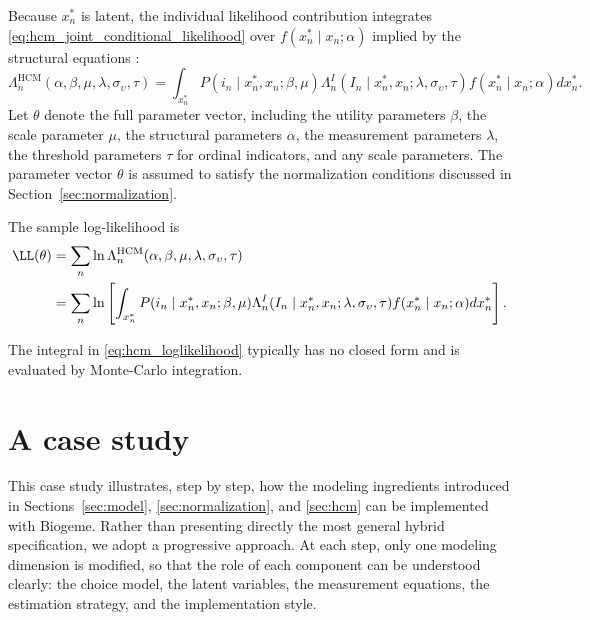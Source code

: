 \documentclass[12pt,a4paper]{article}
\begin{document}
Because $x_n^*$ is latent, the individual likelihood contribution
integrates \eqref{eq:hcm_joint_conditional_likelihood} over
$f(x_n^*\mid x_n;\alpha)$ implied by the structural equations
:
\begin{equation}
  \label{eq:hcm_likelihood}
  \Lambda_n^{\text{HCM}}(\alpha,\beta,\mu,\lambda,\sigma_{\upsilon},\tau)
=
\int_{x_n^*}
P(i_n\mid x_n^*,x_n;\beta,\mu)
\Lambda_n^{I}(I_n\mid x_n^*,x_n;\lambda,\sigma_{\upsilon},\tau)
f(x_n^*\mid x_n;\alpha)
dx_n^*.
\end{equation}
Let $\theta$ denote the full parameter vector, including the utility parameters \(\beta\), the scale parameter $\mu$, the structural parameters
\(\alpha\), the measurement parameters \(\lambda\), the threshold
parameters \(\tau\) for ordinal indicators, and any scale parameters.
The parameter vector \(\theta\) is assumed to satisfy the
normalization conditions discussed in
Section~\ref{sec:normalization}.

The sample
log-likelihood is
\begin{equation}
  \label{eq:hcm_loglikelihood}
  \begin{aligned}
    \LL(\theta) & = \sum_n \ln \Lambda_n^{\text{HCM}}(\alpha,\beta,\mu,\lambda,\sigma_{\upsilon},\tau) \\ &= \sum_n \ln
    \left[ \int_{x_n^*} P(i_n\mid x_n^*,x_n;\beta,\mu) \Lambda_n^{I}(I_n\mid
      x_n^*,x_n;\lambda,\sigma_{\upsilon},\tau) f(x_n^*\mid x_n;\alpha) dx_n^* \right].
  \end{aligned}
\end{equation}

The integral in \eqref{eq:hcm_loglikelihood} typically has no closed
form and is evaluated by Monte-Carlo integration.


\section{A case study}
\label{sec:example}

This case study illustrates, step by step, how the modeling
ingredients introduced in Sections~\ref{sec:model},
\ref{sec:normalization}, and \ref{sec:hcm} can be implemented with
Biogeme. Rather than presenting directly the most general hybrid
specification, we adopt a progressive approach. At each step, only one
modeling dimension is modified, so that the role of each component can
be understood clearly: the choice model, the latent variables, the
measurement equations, the estimation strategy, and the implementation
style.
\end{document}
